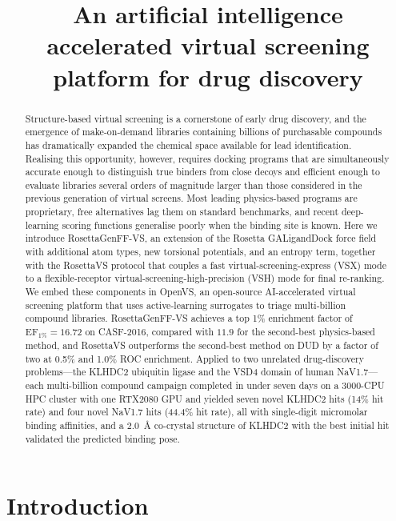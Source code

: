 \documentclass[11pt]{article}
\title{An artificial intelligence accelerated virtual screening platform
for drug discovery}
\author{}
\date{}
\begin{document}
\maketitle

\begin{abstract}
Structure-based virtual screening is a cornerstone of early drug discovery,
and the emergence of make-on-demand libraries containing billions of
purchasable compounds has dramatically expanded the chemical space available
for lead identification. Realising this opportunity, however, requires
docking programs that are simultaneously accurate enough to distinguish
true binders from close decoys and efficient enough to evaluate libraries
several orders of magnitude larger than those considered in the previous
generation of virtual screens. Most leading physics-based programs are
proprietary, free alternatives lag them on standard benchmarks, and recent
deep-learning scoring functions generalise poorly when the binding site is
known. Here we introduce RosettaGenFF-VS, an extension of the Rosetta
GALigandDock force field with additional atom types, new torsional
potentials, and an entropy term, together with the RosettaVS protocol that
couples a fast virtual-screening-express (VSX) mode to a flexible-receptor
virtual-screening-high-precision (VSH) mode for final re-ranking. We embed
these components in OpenVS, an open-source AI-accelerated virtual screening
platform that uses active-learning surrogates to triage multi-billion
compound libraries. RosettaGenFF-VS achieves a top 1\% enrichment factor
of $\mathrm{EF}_{1\%} = 16.72$ on CASF-2016, compared with $11.9$ for the
second-best physics-based method, and RosettaVS outperforms the second-best
method on DUD by a factor of two at 0.5\% and 1.0\% ROC enrichment. Applied
to two unrelated drug-discovery problems---the KLHDC2 ubiquitin ligase and
the VSD4 domain of human NaV1.7---each multi-billion compound campaign
completed in under seven days on a 3000-CPU HPC cluster with one RTX2080
GPU and yielded seven novel KLHDC2 hits (14\% hit rate) and four novel
NaV1.7 hits (44.4\% hit rate), all with single-digit micromolar binding
affinities, and a 2.0~\AA{} co-crystal structure of KLHDC2 with the best
initial hit validated the predicted binding pose.
\end{abstract}

\section{Introduction}
\end{document}
